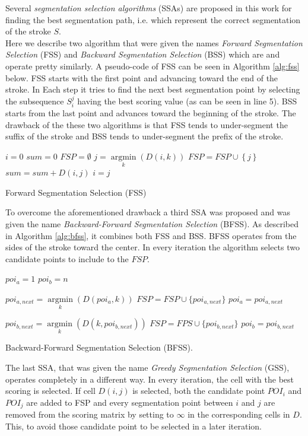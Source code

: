 \documentclass[journal,compsoc]{IEEEtran}
\begin{document}
Several \emph{segmentation selection algorithms} (SSAs) are proposed in this work for finding the best segmentation path, i.e. which represent the correct segmentation of the stroke $S$.\\

Here we describe two algorithm that were given the names \emph{Forward Segmentation Selection} (FSS) and \emph{Backward Segmentation Selection} (BSS) which are and operate pretty similarly. A pseudo-code of FSS can be seen in Algorithm \ref{alg:fss} below. FSS starts with the first point and advancing toward the end of the stroke. In Each step it tries to find the next best segmentation point by selecting the subsequence $S_i^j$ having the best scoring value (as can be seen in line 5). BSS starts from the last point and advances toward the beginning of the stroke. The drawback of the these two algorithms is that FSS tends to under-segment the suffix of the stroke and BSS tends to under-segment the prefix of the stroke.   

\begin{algorithm}
$i=0$\;
$sum=0$\;
$FSP = \emptyset $\;
{
	$j = \mathop {\arg \min }\limits_k \left( {D\left( {i,k} \right)} \right)$\;
	$FSP = FSP \cup \left\{ j \right\}$\;
	$sum = sum + D\left( {i,j} \right)$\;
	$i=j$\;
}
\caption{Forward Segmentation Selection (FSS)}
\label{alg:fss}
\end{algorithm}

To overcome the aforementioned drawback a third SSA was proposed and was given the name \emph{Backward-Forward Segmentation Selection} (BFSS). As described in Algorithm \ref{alg:bfss}, it combines both FSS and BSS. BFSS operates from the sides of the stroke toward the center. In every iteration the algorithm selects two candidate points to include to the $FSP$. \\

\begin{algorithm}
$poi_{a}=1$\;
$poi_{b}=n$\;
{
	$poi_{a,next} = \mathop {\arg \min}\limits_k (D(poi_a,k))$\;
	$FSP = FSP \cup \{poi_{a,next}\}$\;
	$poi_{a}=poi_{a,next}$\;
	
	$poi_{b,next} = \mathop {\arg \min}\limits_k (D(k,poi_{b,next}))$\;
	$FSP = FPS \cup \{poi_{b,next}\}$\;	
	$poi_{b}=poi_{b,next}$\;
}
\caption{Backward-Forward Segmentation Selection (BFSS).}
\label{alg:bfss}
\end{algorithm}
  
The last SSA, that was given the name \emph{Greedy Segmentation Selection} (GSS), operates completely in a different way. In every iteration, the cell with the best scoring is selected. If cell $D(i,j)$ is selected, both the candidate point $POI_{i}$ and $POI_{j}$ are added to FSP and every segmentation point between $i$ and $j$ are removed from the scoring matrix by setting to $\infty$ in the corresponding cells in $D$. This, to avoid those candidate point to be selected in a later iteration. 
\end{document}
